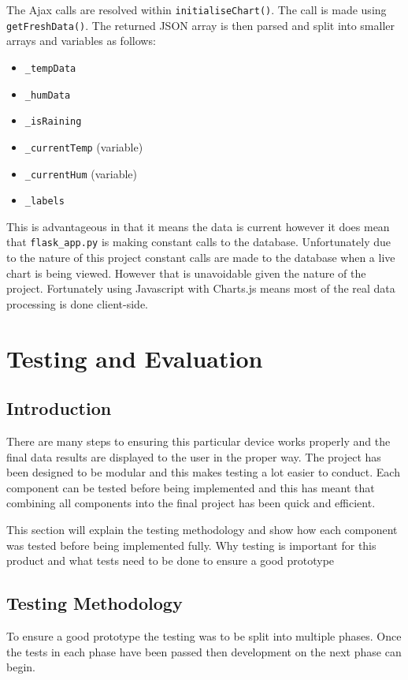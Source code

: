 \documentclass[10pt,a4paper]{article}
\begin{document}
The Ajax calls are resolved within \texttt{initialiseChart()}. The call is made using \texttt{getFreshData()}. The returned JSON array is then parsed and split into smaller arrays and variables as follows: 
\begin{itemize}
\item \texttt{\_tempData}
\item \texttt{\_humData}
\item \texttt{\_isRaining}
\item \texttt{\_currentTemp} (variable)
\item \texttt{\_currentHum} (variable)
\item \texttt{\_labels}
\end{itemize}

This is advantageous in that it means the data is current however it does mean that \texttt{flask\_app.py} is making constant calls to the database. Unfortunately due to the nature of this project constant calls are made to the database when a live chart is being viewed. However that is unavoidable given the nature of the project. Fortunately using Javascript with Charts.js means most of the real data processing is done client-side. 

\pagebreak
\section{Testing and Evaluation}
\subsection{Introduction}
There are many steps to ensuring this particular device works properly and the final data results are displayed to the user in the proper way. The project has been designed to be modular and this makes testing a lot easier to conduct. Each component can be tested before being implemented and this has meant that combining all components into the final project has been quick and efficient.

This section will explain the testing methodology and show how each component was tested before being implemented fully. 
Why testing is important for this product and what tests need to be done to ensure a good prototype
\subsection{Testing Methodology}
To ensure a good prototype the testing was to be split into multiple phases. Once the tests in each phase have been passed then development on the next phase can begin.
\end{document}
